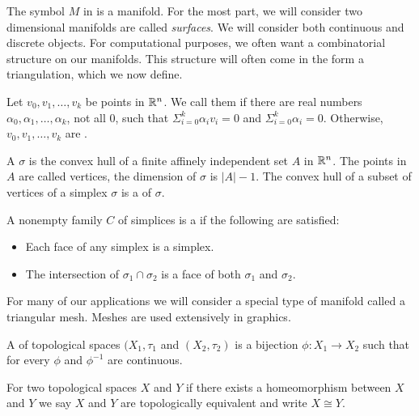 The symbol $M$ in  is a manifold. For the most part, we will consider two dimensional manifolds are called \emph{surfaces}.
We will consider both continuous and discrete objects.
For computational purposes, we often want a combinatorial structure on our manifolds.
This structure will often come in the form a triangulation, which we now define.


\begin{definition}
Let $v_0,v_1,\ldots,v_k$ be points in $\mathbb{R}^n$. We call them 
if there are real numbers $\alpha_0,\alpha_1,\ldots,\alpha_k$, not all 0, such that
$\Sigma_{i=0}^k \alpha_iv_i=0$ and $\Sigma_{i=0}^k \alpha_i=0.$
Otherwise,  $v_0,v_1,\ldots,v_k$ are .

\end{definition}

\begin{definition}[Simplices]
A  $\sigma$ is the convex hull of a finite affinely independent
set $A$ in $\mathbb{R}^n$. The points in  $A$ are  called vertices, the dimension
of  $\sigma$ is $|A|-1$.  The convex hull of a subset of vertices of a simplex
$\sigma$ is a  of $\sigma$.
\end{definition}

\begin{definition}
A nonempty family $C$ of simplices is a  if the following
are satisfied:
\begin{itemize}
\item  Each face of any simplex is a simplex.
\item The intersection of $\sigma_1 \cap \sigma_2$ is a face of both $\sigma_1$ and 
$\sigma_2$.
\end{itemize}


\end{definition}

For many of our applications we will consider a special type of manifold called
a triangular mesh. Meshes are used extensively in graphics.


\begin{definition}[Homeomorphism]
A    of topological spaces $(X_1,\tau_1$ and $(X_2,\tau_2)$
is a bijection $\phi:X_1\to X_2$ such that for every $\phi$ and $\phi^{-1}$ are continuous.
\end{definition}
For two topological spaces $X$ and $Y$ if there exists a  homeomorphism between
$X$ and $Y$ we say $X$ and $Y$ are topologically  equivalent and write  $X\cong Y.$

